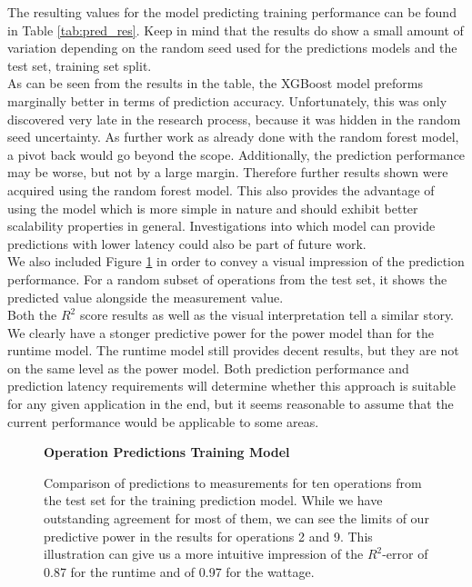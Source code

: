 The resulting values for the model predicting training performance can be found in Table \ref{tab:pred_res}. Keep in mind that the results do show a small amount of variation depending on the random seed used for the predictions models and the test set, training set split. \\
As can be seen from the results in the table, the XGBoost model preforms marginally better in terms of prediction accuracy. Unfortunately, this was only discovered very late in the research process, because it was hidden in the random seed uncertainty. As further work as already done with the random forest model, a pivot back would go beyond the scope. Additionally, the prediction performance may be worse, but not by a large margin. Therefore further results shown were acquired using the random forest model. This also provides the advantage of using the model which is more simple in nature and should exhibit better scalability properties in general. Investigations into which model can provide predictions with lower latency could also be part of future work. \\
We also included Figure \ref{fig:testsetoperations} in order to convey a visual impression of the prediction performance. For a random subset of operations from the test set, it shows the predicted value alongside the measurement value. \\
Both the $R^2$ score results as well as the visual interpretation tell a similar story. We clearly have a stonger predictive power for the power model than for the runtime model. The runtime model still provides decent results, but they are not on the same level as the power model. Both prediction performance and prediction latency requirements will determine whether this approach is suitable for any given application in the end, but it seems reasonable to assume that the current performance would be applicable to some areas.


\begin{figure}[htbp]
    \centering
    \parbox{1.1\textwidth}{\centering\textbf{Operation Predictions Training Model}}
    \caption{Comparison of predictions to measurements for ten operations from the test set for the training prediction model. While we have outstanding agreement for most of them, we can see the limits of our predictive power in the results for operations 2 and 9. This illustration can give us a more intuitive impression of the $R^2$-error of 0.87 for the runtime and of 0.97 for the wattage.}
    \label{fig:testsetoperations}
\end{figure}


